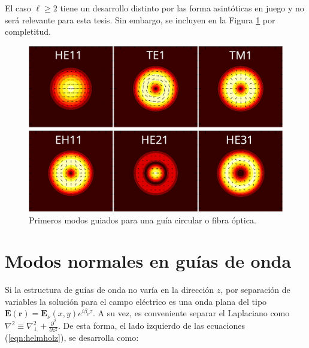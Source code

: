 El caso $\ell \ge 2$ tiene un desarrollo distinto por las forma asintóticas en juego y no será relevante para esta tesis. Sin embargo, se incluyen en la Figura \ref{fig:vortices} por completitud.
\begin{figure}[H]
	\includegraphics[width=\linewidth]{media/OAM_analitic}
		\caption{Primeros modos guiados para una guía circular o fibra óptica. \label{fig:vortices}}
\end{figure}

\section{Modos normales en guías de onda}

Si la estructura de guías de onda no varía en la dirección $z$, por separación de variables la solución para el campo eléctrico es una onda plana del tipo $\textbf{E}(\textbf{r}) = \textbf{E}_\nu(x, y) e^{i\beta_\nu z}$. A su vez, es conveniente separar el Laplaciano como $\nabla^2 \equiv \nabla_\perp^2 + \frac{\partial^2}{\partial z^2}$. De esta forma, el lado izquierdo de las ecuaciones (\ref{eqn:helmholz}), se desarrolla como:

